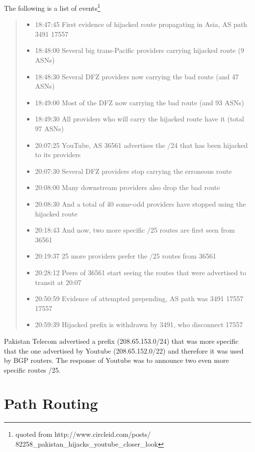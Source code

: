 The following is a list of events\footnote{quoted from http://www.circleid.com/posts/ 82258\_pakistan\_hijacks\_youtube\_closer\_look}
\begin{quote}
\begin{itemize}
\item 18:47:45    First evidence of hijacked route propagating in Asia, AS path 3491 17557
\item 18:48:00    Several big trans-Pacific providers carrying hijacked route (9 ASNs)
\item 18:48:30    Several DFZ providers now carrying the bad route (and 47 ASNs)
\item 18:49:00    Most of the DFZ now carrying the bad route (and 93 ASNs)
\item 18:49:30    All providers who will carry the hijacked route have it (total 97 ASNs)
\item 20:07:25    YouTube, AS 36561 advertises the /24 that has been hijacked to its providers
\item 20:07:30    Several DFZ providers stop carrying the erroneous route
\item 20:08:00    Many downstream providers also drop the bad route
\item 20:08:30    And a total of 40 some-odd providers have stopped using the hijacked route
\item 20:18:43    And now, two more specific /25 routes are first seen from 36561
\item 20:19:37    25 more providers prefer the /25 routes from 36561
\item 20:28:12    Peers of 36561 start seeing the routes that were advertised to transit at 20:07
\item 20:50:59    Evidence of attempted prepending, AS path was 3491 17557 17557
\item 20:59:39    Hijacked prefix is withdrawn by 3491, who disconnect 17557
\end{itemize}
\end{quote}

Pakistan Telecom advertised a prefix (208.65.153.0/24) that was more specific that the one advertised by Youtube (208.65.152.0/22) and therefore it was used by BGP routers.
The response of Youtube was to announce two even more specific routes /25.

\section{Path Routing}

